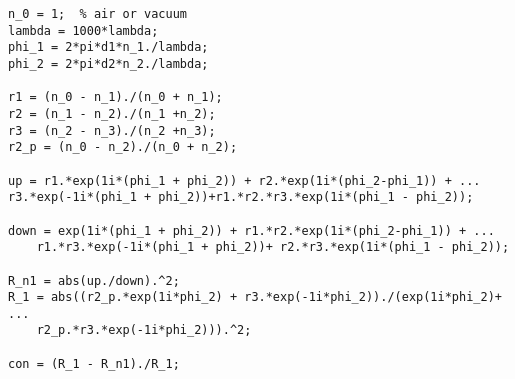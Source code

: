 \begin{singlespace}
\begin{lstlisting}
n_0 = 1;  % air or vacuum
lambda = 1000*lambda;
phi_1 = 2*pi*d1*n_1./lambda;
phi_2 = 2*pi*d2*n_2./lambda;

r1 = (n_0 - n_1)./(n_0 + n_1);
r2 = (n_1 - n_2)./(n_1 +n_2);
r3 = (n_2 - n_3)./(n_2 +n_3);
r2_p = (n_0 - n_2)./(n_0 + n_2);

up = r1.*exp(1i*(phi_1 + phi_2)) + r2.*exp(1i*(phi_2-phi_1)) + ...
r3.*exp(-1i*(phi_1 + phi_2))+r1.*r2.*r3.*exp(1i*(phi_1 - phi_2));

down = exp(1i*(phi_1 + phi_2)) + r1.*r2.*exp(1i*(phi_2-phi_1)) + ...
    r1.*r3.*exp(-1i*(phi_1 + phi_2))+ r2.*r3.*exp(1i*(phi_1 - phi_2));

R_n1 = abs(up./down).^2;
R_1 = abs((r2_p.*exp(1i*phi_2) + r3.*exp(-1i*phi_2))./(exp(1i*phi_2)+ ...
    r2_p.*r3.*exp(-1i*phi_2))).^2;

con = (R_1 - R_n1)./R_1;

\end{lstlisting}

\end{singlespace} 